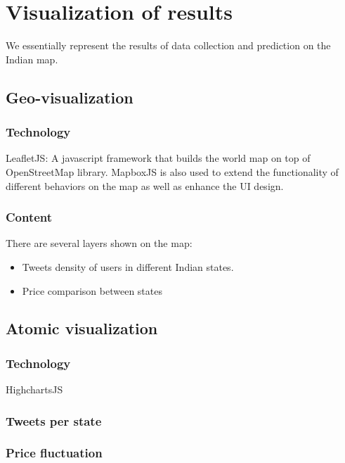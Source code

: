 \section*{Visualization of results}

We essentially represent the results of data collection and prediction on the Indian map. 

\subsection*{Geo-visualization}

\subsubsection*{Technology}
LeafletJS: A javascript framework that builds the world map on top of OpenStreetMap library. MapboxJS is also used to extend the functionality of different behaviors on the map as well as enhance the UI design.

\subsubsection*{Content}
There are several layers shown on the map:\\
\begin{itemize}
\item Tweets density of users in different Indian states.
\item Price comparison between states\\
\end{itemize}

\subsection*{Atomic visualization}
\subsubsection*{Technology}
HighchartsJS

\subsubsection*{Tweets per state}


\subsubsection*{Price fluctuation}